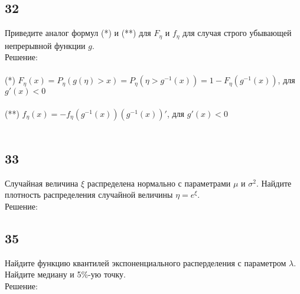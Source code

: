 \documentclass[a4paper, 12pt]{extarticle}
\numberwithin{figure}{section}
\begin{document}
\subsection*{32}
Приведите аналог формул (*) и (**) для $F_\eta$ и $f_\eta$ для случая строго убывающей непрерывной функции $g$.\\

Решение:\\
\\
(*) $F_\eta(x) = P_\eta(g(\eta)>x)=P_\eta(\eta>g^{-1}(x)) = 1 - F_\eta(g^{-1}(x))$, для $g'(x) < 0$\\
\\
(**) $f_\eta(x) = - f_\eta(g^{-1}(x))(g^{-1}(x))'$, для $g'(x) < 0$\\
\\


\subsection*{33}
Случайная величина $\xi$ распределена нормально с параметрами $\mu$ и $\sigma^2$. Найдите плотность распределения случайной величины $\eta = e^\xi$.\\

Решение:\\

\subsection*{35}
Найдите функцию квантилей экспоненциального расперделения с параметром $\lambda$.\\
Найдите медиану и 5\%-ую точку.\\

Решение:\\
\end{document}
